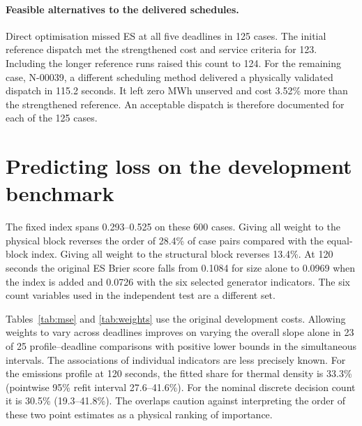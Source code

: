 \documentclass[11pt,a4paper]{article}
\begin{document}
\paragraph{Feasible alternatives to the delivered schedules.}
Direct optimisation missed ES at all five deadlines in 125 cases. The initial reference dispatch met the strengthened cost and service criteria for 123. Including the longer reference runs raised this count to 124.
For the remaining case, N-00039, a different scheduling method delivered a physically validated dispatch in 115.2 seconds. It left zero MWh unserved and cost 3.52\% more than the strengthened reference. An acceptable dispatch is therefore documented for each of the 125 cases.

\section{Predicting loss on the development benchmark}
\label{app:devfit}
The fixed index spans 0.293--0.525 on these 600 cases. Giving all weight to the physical block reverses the order of 28.4\% of case pairs compared with the equal-block index. Giving all weight to the structural block reverses 13.4\%. At 120 seconds the original ES Brier score falls from 0.1084 for size alone to 0.0969 when the index is added and 0.0726 with the six selected generator indicators. The six count variables used in the independent test are a different set.

Tables~\ref{tab:mse} and \ref{tab:weights} use the original development costs. Allowing weights to vary across deadlines improves on varying the overall slope alone in 23 of 25 profile--deadline comparisons with positive lower bounds in the simultaneous intervals. The associations of individual indicators are less precisely known. For the emissions profile at 120 seconds, the fitted share for thermal density is 33.3\% (pointwise 95\% refit interval 27.6--41.6\%). For the nominal discrete decision count it is 30.5\% (19.3--41.8\%). The overlaps caution against interpreting the order of these two point estimates as a physical ranking of importance.
\end{document}
